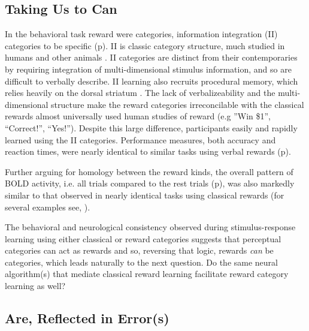 \documentclass[doc,12pt]{apa}        %
\begin{document}
\subsection{Taking Us to Can}
\label{sub:tocan}
In the behavioral task reward were categories, information integration (II) categories to be specific (p\pageref{subsub:whatwhen}).  II is classic category structure, much studied in humans and other animals \cite{Smith:2011p9101,Ashby:2011p9148,Smith:2010p9713}.  II categories are distinct from their contemporaries by requiring integration of multi-dimensional stimulus information, and so are difficult to verbally describe. II learning also recruits procedural memory, which relies heavily on the dorsal striatum \cite{Ashby:1998p9716}.   The lack of verbalizeability and the multi-dimensional structure make the reward categories irreconcilable with the classical rewards almost universally used human studies of reward (e.g ''Win \$1'', ``Correct!'', ``Yes!'').  Despite this large difference, participants easily and rapidly learned using the II categories.  Performance measures, both accuracy and reaction times, were nearly identical to similar tasks using verbal rewards (p\pageref{subsub:wellbehaved}).  

Further arguing for homology between the reward kinds, the overall pattern of BOLD activity, i.e. all trials compared to the rest trials (p\pageref{sub:blob}), was also markedly similar to that observed in nearly identical tasks using classical rewards (for several examples see, ).

The behavioral and neurological consistency observed during stimulus-response learning using either classical or reward categories suggests that perceptual categories can act as rewards and so, reversing that logic, rewards \emph{can} be categories, which leads naturally to the next question. Do the same neural algorithm(s) that mediate classical reward learning facilitate reward category learning as well?

\subsection{Are, Reflected in Error(s)}
\label{sub:inerror}
\end{document}

